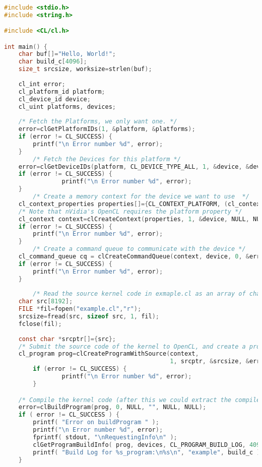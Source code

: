 \documentclass{report}
\begin{document}
\begin{lstlisting}[language=c]

#include <stdio.h>
#include <string.h>

#include <CL/cl.h>

int main() {
	char buf[]="Hello, World!";
	char build_c[4096];
	size_t srcsize, worksize=strlen(buf);
	
	cl_int error;
	cl_platform_id platform;
	cl_device_id device;
	cl_uint platforms, devices;
    
	/* Fetch the Platforms, we only want one. */
	error=clGetPlatformIDs(1, &platform, &platforms);
	if (error != CL_SUCCESS) {
		printf("\n Error number %d", error);
	}
        /* Fetch the Devices for this platform */
	error=clGetDeviceIDs(platform, CL_DEVICE_TYPE_ALL, 1, &device, &devices);
	if (error != CL_SUCCESS) {  
                printf("\n Error number %d", error);
	}
        /* Create a memory context for the device we want to use  */
	cl_context_properties properties[]={CL_CONTEXT_PLATFORM, (cl_context_properties)platform,0};
	/* Note that nVidia's OpenCL requires the platform property */
	cl_context context=clCreateContext(properties, 1, &device, NULL, NULL, &error);
	if (error != CL_SUCCESS) {
		printf("\n Error number %d", error);
	}
        /* Create a command queue to communicate with the device */
	cl_command_queue cq = clCreateCommandQueue(context, device, 0, &error);
	if (error != CL_SUCCESS) {
		printf("\n Error number %d", error);
	}
	
        /* Read the source kernel code in exmaple.cl as an array of char's */
	char src[8192];
	FILE *fil=fopen("example.cl","r");
	srcsize=fread(src, sizeof src, 1, fil);
	fclose(fil);
    
	const char *srcptr[]={src};
	/* Submit the source code of the kernel to OpenCL, and create a program object with it */
	cl_program prog=clCreateProgramWithSource(context,
                                              1, srcptr, &srcsize, &error);
        if (error != CL_SUCCESS) {
                printf("\n Error number %d", error);
        }

	/* Compile the kernel code (after this we could extract the compiled version) */
	error=clBuildProgram(prog, 0, NULL, "", NULL, NULL);
	if ( error != CL_SUCCESS ) {
		printf( "Error on buildProgram " );
		printf("\n Error number %d", error);
		fprintf( stdout, "\nRequestingInfo\n" );
		clGetProgramBuildInfo( prog, devices, CL_PROGRAM_BUILD_LOG, 4096, build_c, NULL );
		printf( "Build Log for %s_program:\n%s\n", "example", build_c );
	}
    

\end{lstlisting}
\end{document}
